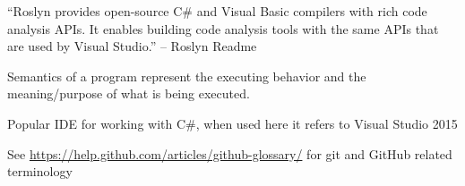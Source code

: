 \documentclass[draftclsnofoot,onecolumn]{IEEEtran}
\begin{document}
\begin{description}
\item[Roslyn:] “Roslyn provides open-source C\# and Visual Basic compilers with rich code analysis APIs. It enables building code analysis tools with the same APIs that are used by Visual Studio.” – Roslyn Readme 

\item[Semantics:] Semantics of a program represent the executing behavior and the meaning/purpose of what is being executed. 

\item[VS:] Popular IDE for working with C\#, when used here it refers to Visual Studio 2015

\end{description}

See \url{https://help.github.com/articles/github-glossary/} for git and GitHub related terminology
\end{document}
